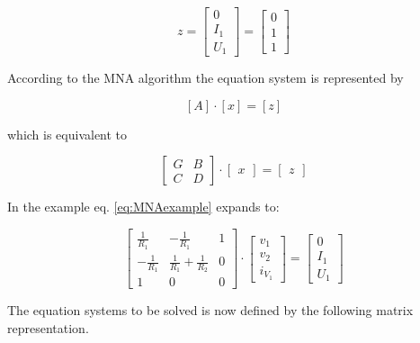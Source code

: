 \documentclass[10pt]{report}
\begin{document}
\begin{equation}
z =
\begin{bmatrix}
0\\
I_{1}\\
U_{1}
\end{bmatrix}
=
\begin{bmatrix}
0\\
1\\
1
\end{bmatrix}
\end{equation}

According to the MNA algorithm the equation system is represented by

\begin{equation}
\left[A\right] \cdot \left[x\right] = \left[z\right]
\end{equation}

which is equivalent to

\begin{equation}
\begin{bmatrix}
G & B\\
C & D
\end{bmatrix}
\cdot
\begin{bmatrix}
x
\end{bmatrix}
=
\begin{bmatrix}
z
\end{bmatrix}
\label{eq:MNAexample}
\end{equation}

In the example eq. \eqref{eq:MNAexample} expands to:

\begin{equation}
\begin{bmatrix}
\frac{1}{R_{1}} & -\frac{1}{R_{1}} & 1\\
-\frac{1}{R_{1}} & \frac{1}{R_{1}} + \frac{1}{R_{2}} & 0\\
1 & 0 & 0
\end{bmatrix}
\cdot
\begin{bmatrix}
v_{1}\\
v_{2}\\
i_{V_{1}}
\end{bmatrix}
=
\begin{bmatrix}
0\\
I_{1}\\
U_{1}
\end{bmatrix}
\label{eq:MNAfull}
\end{equation}

The equation systems to be solved is now defined by the following
matrix representation.
\end{document}
